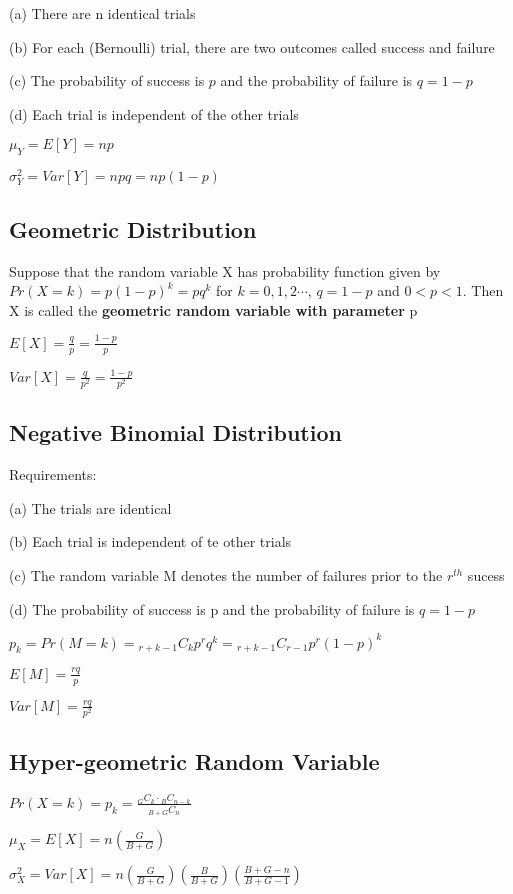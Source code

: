 \documentclass[12pt]{article}
\begin{document}
\begin{spacing}{2.0}
(a) There are n identical trials

(b) For each (Bernoulli) trial, there are two outcomes called success and failure

(c) The probability of success is $p$ and the probability of failure is $q=1-p$

(d) Each trial is independent of the other trials

$\mu_Y= E[Y]= np$

$\sigma^2_Y = Var[Y]= npq=np(1-p)$

\subsection{Geometric Distribution}

Suppose that the random variable X has probability function given by $Pr(X=k)= p(1-p)^k= pq^k$ for $k=0,1,2\cdots$, $q=1-p$ and $0<p<1$. Then X is called the \textbf{geometric random variable with parameter} p

$E[X]= \frac{q}{p} = \frac{1-p}{p}$

$Var[X]= \frac{q}{p^2}= \frac{1-p}{p^2}$

\subsection{Negative Binomial Distribution}

Requirements:

(a) The trials are identical

(b) Each trial is independent of te other trials

(c) The random variable M denotes the number of failures prior to the $r^{th}$ sucess

(d) The probability of success is p and the probability of failure is $q=1-p$

$p_k=Pr(M=k)= {}_{r+k-1}C_{k} p^r q^k = {}_{r+k-1}C_{r-1} p^r (1-p)^k$

$E[M]= \frac{rq}{p}$

$Var[M]= \frac{rq}{p^2}$

\subsection{Hyper-geometric Random Variable}

$Pr(X=k)= p_k= \frac{{}_{G}C_{k} \cdot {}_{B}C_{n-k}}{{}_{B+G}C_{n}}$

$\mu_X= E[X]= n\left( \frac{G}{B+G} \right)$

$\sigma_X^2 = Var[X] = n\left( \frac{G}{B+G} \right) \left( \frac{B}{B+G} \right) \left( \frac{B+G-n}{B+G-1} \right)$


\end{spacing}
\end{document}
